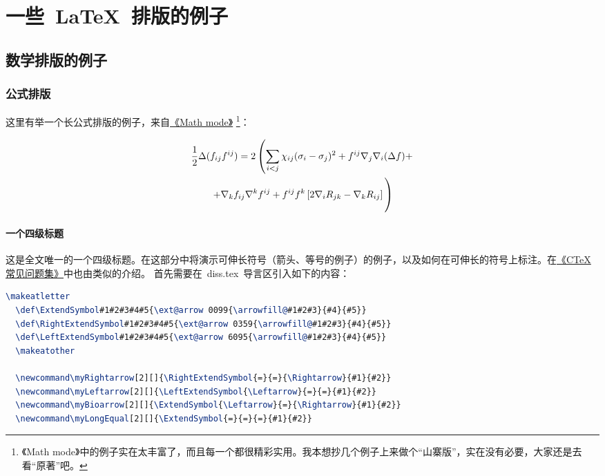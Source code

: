 

\chapter{一些~\LaTeX~排版的例子}
\label{chap:example}

\section{数学排版的例子}
\label{sec:matheq}

\subsection{公式排版}
\label{sec:eqformat}

这里有举一个长公式排版的例子，来自\href{http://www.tex.ac.uk/tex-archive/info/math/voss/mathmode/Mathmode.pdf}{《Math mode》}
\footnote{《Math mode》中的例子实在太丰富了，而且每一个都很精彩实用。我本想抄几个例子上来做个``山寨版''，实在没有必要，大家还是去看``原著''吧。}：

\begin {multline}
  \frac {1}{2}\Delta (f_{ij}f^{ij})=
  2\left (\sum _{i<j}\chi _{ij}(\sigma _{i}-
    \sigma _{j}) ^{2}+ f^{ij}\nabla _{j}\nabla _{i}(\Delta f)+\right .\\
  \left .+\nabla _{k}f_{ij}\nabla ^{k}f^{ij}+
    f^{ij}f^{k}\left [2\nabla _{i}R_{jk}-
      \nabla _{k}R_{ij}\right ]\vphantom {\sum _{i<j}}\right )
\end{multline}

\subsubsection{一个四级标题}
\label{sec:depth4}

这是全文唯一的一个四级标题。在这部分中将演示可伸长符号（箭头、等号的例子）的例子，以及如何在可伸长的符号上标注。在\href{http://zhou63.ahut.edu.cn/latex/ctexfaq.pdf}{《CTeX常见问题集》}中也由类似的介绍。
首先需要在~diss.tex~导言区引入如下的内容：

\begin{lstlisting}[language={TeX}, caption={插入导言区的内容}]
  \makeatletter
  \def\ExtendSymbol#1#2#3#4#5{\ext@arrow 0099{\arrowfill@#1#2#3}{#4}{#5}}
  \def\RightExtendSymbol#1#2#3#4#5{\ext@arrow 0359{\arrowfill@#1#2#3}{#4}{#5}}
  \def\LeftExtendSymbol#1#2#3#4#5{\ext@arrow 6095{\arrowfill@#1#2#3}{#4}{#5}}
  \makeatother
  
  \newcommand\myRightarrow[2][]{\RightExtendSymbol{=}{=}{\Rightarrow}{#1}{#2}}
  \newcommand\myLeftarrow[2][]{\LeftExtendSymbol{\Leftarrow}{=}{=}{#1}{#2}}
  \newcommand\myBioarrow[2][]{\ExtendSymbol{\Leftarrow}{=}{\Rightarrow}{#1}{#2}}
  \newcommand\myLongEqual[2][]{\ExtendSymbol{=}{=}{=}{#1}{#2}}
\end{lstlisting}

